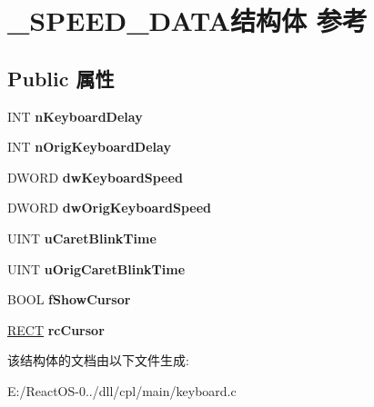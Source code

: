 \hypertarget{struct___s_p_e_e_d___d_a_t_a}{}\section{\+\_\+\+S\+P\+E\+E\+D\+\_\+\+D\+A\+T\+A结构体 参考}
\label{struct___s_p_e_e_d___d_a_t_a}
\subsection*{Public 属性}
\begin{DoxyCompactItemize}
\item 
\mbox{\label{struct___s_p_e_e_d___d_a_t_a_af1fa281321be3522027bbd31e31f139e}} 
I\+NT {\bfseries n\+Keyboard\+Delay}
\item 
\mbox{\label{struct___s_p_e_e_d___d_a_t_a_ae0a43f63547e13d0dcf0033ba320762d}} 
I\+NT {\bfseries n\+Orig\+Keyboard\+Delay}
\item 
\mbox{\label{struct___s_p_e_e_d___d_a_t_a_af664d83d5e536df7b949f6bfdc2cc5d5}} 
D\+W\+O\+RD {\bfseries dw\+Keyboard\+Speed}
\item 
\mbox{\label{struct___s_p_e_e_d___d_a_t_a_a1479281a42cd5cb050b8070ef1e45131}} 
D\+W\+O\+RD {\bfseries dw\+Orig\+Keyboard\+Speed}
\item 
\mbox{\label{struct___s_p_e_e_d___d_a_t_a_af966e0e3efbb9dec532f60c7e57b568a}} 
U\+I\+NT {\bfseries u\+Caret\+Blink\+Time}
\item 
\mbox{\label{struct___s_p_e_e_d___d_a_t_a_aa890e98a2a27facf603a2eb675ba66c9}} 
U\+I\+NT {\bfseries u\+Orig\+Caret\+Blink\+Time}
\item 
\mbox{\label{struct___s_p_e_e_d___d_a_t_a_a24ffe345f4514535ef23d4e24fdfc7fe}} 
B\+O\+OL {\bfseries f\+Show\+Cursor}
\item 
\mbox{\label{struct___s_p_e_e_d___d_a_t_a_a573ecc3d35f114fb53dee0f4e543ca60}} 
\hyperlink{structtag_r_e_c_t}{R\+E\+CT} {\bfseries rc\+Cursor}
\end{DoxyCompactItemize}


该结构体的文档由以下文件生成\+:\begin{DoxyCompactItemize}
\item 
E\+:/\+React\+O\+S-\/0../dll/cpl/main/keyboard.\+c\end{DoxyCompactItemize}
